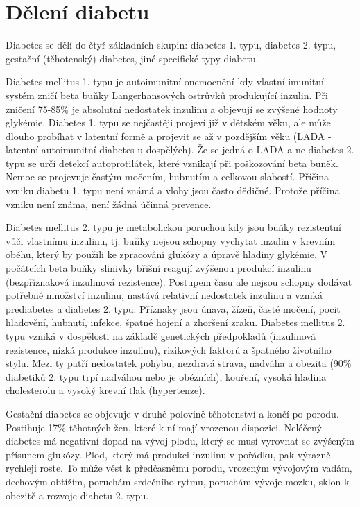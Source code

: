 \section{Dělení diabetu}

Diabetes se dělí do čtyř základních skupin: diabetes 1. typu, diabetes 2. typu, gestační (těhotenský) diabetes, jiné specifické typy diabetu.

Diabetes mellitus 1. typu je autoimunitní onemocnění kdy vlastní imunitní systém zničí beta buňky Langerhansových ostrůvků produkující inzulin. Při zničení 75-85\% je absolutní nedostatek inzulinu a objevují se zvýšené hodnoty glykémie. Diabetes 1. typu se nejčastěji projeví již v dětském věku, ale může dlouho probíhat v latentní formě a projevit se až v pozdějším věku (LADA - latentní autoimunitní diabetes u dospělých). Že se jedná o LADA a ne diabetes 2. typu se určí detekcí autoprotilátek, které vznikají při poškozování beta buněk. Nemoc se projevuje častým močením, hubnutím a celkovou slabostí. Příčina vzniku diabetu 1. typu není známá a vlohy jsou často dědičné. Protože příčina vzniku není známa, není žádná účinná prevence.

Diabetes mellitus 2. typu je metabolickou poruchou kdy jsou buňky rezistentní vůči vlastnímu inzulinu, tj. buňky nejsou schopny vychytat inzulin v krevním oběhu, který by použili ke zpracování glukózy a úpravě hladiny glykémie. V počátcích beta buňky slinivky břišní reagují zvýšenou produkcí inzulinu (bezpříznaková inzulinová rezistence). Postupem času ale nejsou schopny dodávat potřebné množství inzulinu, nastává relativní nedostatek inzulinu a vzniká prediabetes a diabetes 2. typu. Příznaky jsou únava, žízeň, časté močení, pocit hladovění, hubnutí, infekce, špatné hojení a zhoršení zraku. Diabetes mellitus 2. typu vzniká v dospělosti na základě genetických předpokladů (inzulinová rezistence, nízká produkce inzulinu), rizikových faktorů a špatného životního stylu. Mezi ty patří nedostatek pohybu, nezdravá strava, nadváha a obezita (90\% diabetiků 2. typu trpí nadváhou nebo je obézních), kouření, vysoká hladina cholesterolu a vysoký krevní tlak (hypertenze).

Gestační diabetes se objevuje v druhé polovině těhotenství a končí po porodu. Postihuje 17\% těhotných žen, které k ní mají vrozenou dispozici. Neléčený diabetes má negativní dopad na vývoj plodu, který se musí vyrovnat se zvýšeným přísunem glukózy. Plod, který má produkci inzulinu v pořádku, pak výrazně rychleji roste. To může vést k předčasnému porodu, vrozeným vývojovým vadám, dechovým obtížím, poruchám srdečního rytmu, poruchám vývoje mozku, sklon k obezitě a rozvoje diabetu 2. typu.

